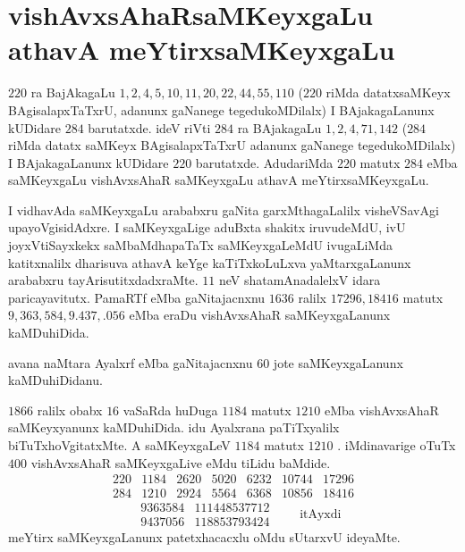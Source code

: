 \chapter{vishAvxsAhaRsaMKeyxgaLu athavA meYtirxsaMKeyxgaLu}
\vskip -20pt

$220$ ra BajAkagaLu $1,2,4,5,10,11,20,22,44,55,110$ ($220$ riMda datatxsaMKeyx BAgisalapxTaTxrU, adanunx gaNanege tegedukoMDilalx) I BAjakagaLanunx kUDidare $284$ barutatxde. ideV riVti $284$ ra BAjakagaLu $1,2,4,71,142$ ($284$ riMda datatx saMKeyx BAgisalapxTaTxrU adanunx gaNanege tegedukoMDilalx) I BAjakagaLanunx kUDidare $220$ barutatxde. AdudariMda $220$ matutx $284$ eMba saMKeyxgaLu vishAvxsAhaR saMKeyxgaLu athavA meYtirxsaMKeyxgaLu.

I vidhavAda saMKeyxgaLu arababxru gaNita garxMthagaLalilx visheVSavAgi upa\-yoVgisidAdxre. I saMKeyxgaLige aduBxta shakitx iruvudeMdU, ivU joyxVtiSayxkekx saMbaMdhapaTaTx saMKeyxgaLeMdU ivugaLiMda katitxnalilx dharisuva athavA keYge kaTiTxkoLuLxva yaMtarxgaLanunx arababxru tayArisutitxdadxraMte. $11$ neV shatamAnadalelxV idara paricayavitutx. PamaRTf eMba gaNitajacnxnu $1636$ ralilx $17296, 18416$ matutx $9,363,584,9.437,.056$  eMba eraDu vishAvxsAhaR saMKeyxgaLanunx kaMDuhiDida.

avana naMtara Ayalxrf eMba gaNitajacnxnu $60$ jote saMKeyxgaLanunx kaMDuhiDidanu.

$1866$ ralilx obabx $16$ vaSaRda huDuga $1184$ matutx $1210$ eMba vishAvxsAhaR saMKeyxyanunx kaMDuhiDida. idu Ayalxrana paTiTxyalilx biTuTxhoVgitatxMte. A saMKeyxgaLeV $1184$ matutx $1210$ . iMdinavarige oTuTx $400$ vishAvxsAhaR saMKeyxgaLive eMdu tiLidu baMdide. 
{\fontsize{10}{12}\selectfont
$$
\begin{matrix}
220 & 1184 & 2620 & 5020 & 6232 & 10744 & 17296\\ 
284 & 1210 & 2924 & 5564 & 6368 & 10856 & 18416 
\end{matrix}
$$
$$
\begin{matrix}
& 9363584 & 111448537712 \\
& 9437056 & 118853793424 
\end{matrix}
\qquad \text{itAyxdi} 
$$}
meYtirx saMKeyxgaLanunx patetxhacacxlu oMdu sUtarxvU ideyaMte.
